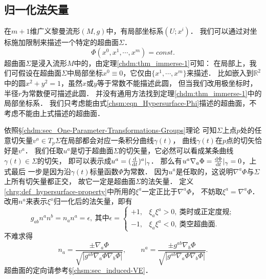 
\subsection{归一化法矢量}\label{chsm:sec_Phi-n}
在$m+1$维广义黎曼流形$(M,g)$中，有局部坐标系$(U;x^i)$．
我们可以通过对坐标施加限制来描述一个特定的超曲面$\Sigma$．
\begin{equation}\label{chsm:eqn_Hypersurface-Phi}
    \Phi(x^0,x^1,\cdots,x^{m}) =const .
\end{equation}
超曲面$\Sigma$是浸入流形$M$中的，由定理\ref{chdm:thm_immerse-1}可知：
在局部上，我们可假设在超曲面$\Sigma$中局部坐标$x^0\equiv 0$，它仅由$\{x^1,\cdots,x^m\}$来描述．
比如嵌入到$\mathbb{R}^2$中的圆$x^2+y^2=1$，虽然$x$或$y$等于常数不能描述此圆，
但当我们改用极坐标时，半径$r$为常数便可描述此圆．
并没有通用方法找到定理\ref{chdm:thm_immerse-1}中的局部坐标系．
我们只考虑能由式\eqref{chsm:eqn_Hypersurface-Phi}描述的超曲面，不考虑不能由上式描述的超曲面．

依照\S \ref{chdm:sec_One-Parameter-Transformations-Groups}理论
可知$\Sigma$上点$p$处的任意切矢量$v^a\in T_p \Sigma$在局部都会对应一条积分曲线$\gamma(t)$，
曲线$\gamma(t)$在$p$点的切矢恰好是$v^a$．
我们任取$u^a$是切于超曲面$\Sigma$的切矢量，它必然可以看成某条曲线$\gamma(t)\in \Sigma$的切矢，
即可以表示成$u^a=(\frac{{\rm d}}{{\rm d}t})^a|_{\gamma}$．
那么有$u^a\nabla_a \Phi= \frac{{\rm d}\Phi}{{\rm d}t}|_{\gamma} =0$，上式最后
一步是因为沿$\gamma(t)$标量函数$\Phi$为常数．
因为$u^a$是任取的，这说明$\nabla^a \Phi$与$\Sigma$上所有切矢量都正交，
故它一定是超曲面$\Sigma$的法矢量．
定义\ref{chrg:def_hypersurface-property}中所用的$\xi^a$一定正比于$\nabla^a \Phi$，
不妨取$\xi^a=\nabla^a\Phi$．
改用${n}^a$来表示$\xi^a$归一化后的法矢量，即有
\begin{equation}\label{chsm:eqn_unit-normal}
    g_{ab} {n}^a {n}^b=n_a n^a = \epsilon , \ \text{其中} \epsilon=
    \begin{cases}
        +1, & {\xi}_a {\xi}^a>0, \ \text{类时或正定度规}; \\
        -1, & {\xi}_a {\xi}^a<0, \ \text{类空超曲面}.
    \end{cases}
\end{equation}
不难求得
\begin{equation}\label{chsm:eqn_unit-normal-Phi}
    n_a=\frac{\pm \nabla_a \Phi}{\sqrt{|g^{ab}\nabla_a \Phi\nabla_b \Phi|} },     \qquad
    n^a=\frac{\pm g^{ab}\nabla_b \Phi}{\sqrt{|g^{ab}\nabla_a \Phi\nabla_b \Phi|} } .
\end{equation}
超曲面的定向请参考\S\ref{chsm:sec_induced-VE}．


